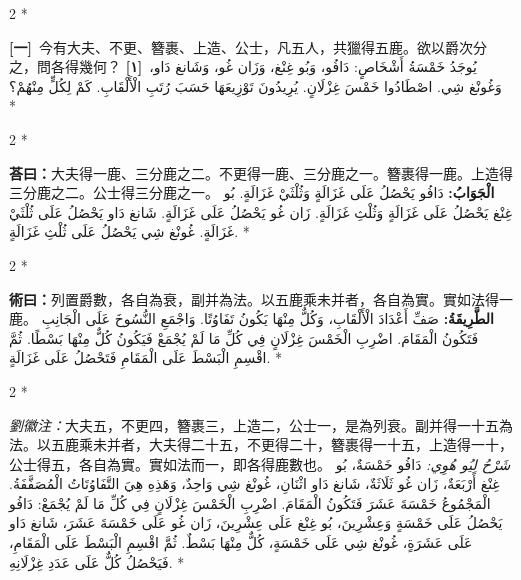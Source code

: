 \documentclass[11pt,a4paper]{article}
\newcommand{\ar}[1]{\arabicfont\beginR #1\endR}
\newcommand{\problemnum}[1]{\textbf{[\ignorespaces#1\unskip]}}
\newenvironment{bilingual}{%
  \begin{paracol}{2}%
  \switchcolumn[0]*%
}{%
  \end{paracol}%
}
\newcommand{\cnline}[1]{\switchcolumn[0]\noindent #1 \switchcolumn[1]}
\newcommand{\arline}[1]{\noindent\ar{#1} \switchcolumn[0]*}
\newenvironment{prob bilingual}{%
  \begin{paracol}{2}%
  \switchcolumn[0]*%
}{%
  \end{paracol}%
  \vspace{0.3em}%
}
\begin{document}
\vspace{0.5em}

\begin{bilingual}
\cnline{\problemnum{一}\, 今有大夫、不更、簪裹、上造、公士，凡五人，共獵得五鹿。欲以爵次分之，問各得幾何？}
\arline{\problemnum{١}\, يُوجَدُ خَمْسَةُ أَشْخَاصٍ: دَافُو، وَبُو غِنْغ، وَزَان غُو، وَشَانغ دَاو، وَغُونْغ شِي. اصْطَادُوا خَمْسَ غِزْلَانٍ. يُرِيدُونَ تَوْزِيعَهَا حَسَبَ رُتَبِ الْأَلْقَابِ. كَمْ لِكُلٍّ مِنْهُمْ؟}
\end{bilingual}

\begin{bilingual}
\cnline{\textcolor{answercolor}{\textbf{荅曰：}}大夫得一鹿、三分鹿之二。不更得一鹿、三分鹿之一。簪裹得一鹿。上造得三分鹿之二。公士得三分鹿之一。}
\arline{\textcolor{answercolor}{\textbf{الْجَوَابُ:}} دَافُو يَحْصُلُ عَلَى غَزَالَةٍ وَثُلْثَيْ غَزَالَةٍ. بُو غِنْغ يَحْصُلُ عَلَى غَزَالَةٍ وَثُلْثِ غَزَالَةٍ. زَان غُو يَحْصُلُ عَلَى غَزَالَةٍ. شَانغ دَاو يَحْصُلُ عَلَى ثُلْثَيْ غَزَالَةٍ. غُونْغ شِي يَحْصُلُ عَلَى ثُلْثِ غَزَالَةٍ.}
\end{bilingual}

\begin{bilingual}
\cnline{%
\textcolor{methodcolor}{\textbf{術曰：}}列置爵數，各自為衰，副并為法。以五鹿乘未并者，各自為實。實如法得一鹿。
}
\arline{%
\textcolor{methodcolor}{\textbf{الطَّرِيقَةُ:}} صَفِّ أَعْدَادَ الْأَلْقَابِ، وَكُلٌّ مِنْهَا يَكُونُ تَفَاوُتًا. وَاجْمَعِ النُّسُوخَ عَلَى الْجَانِبِ فَتَكُونُ الْمَقَامَ. اضْرِبِ الْخَمْسَ غِزْلَانٍ فِي كُلِّ مَا لَمْ يُجْمَعْ فَيَكُونُ كُلٌّ مِنْهَا بَسْطًا. ثُمَّ اقْسِمِ الْبَسْطَ عَلَى الْمَقَامِ فَتَحْصُلُ عَلَى غَزَالَةٍ.
}
\end{bilingual}

\begin{bilingual}
\cnline{%
\textcolor{commentarycolor}{\small\textit{劉徽注：}}大夫五，不更四，簪裹三，上造二，公士一，是為列衰。副并得一十五為法。以五鹿乘未并者，大夫得二十五，不更得二十，簪裹得一十五，上造得一十，公士得五，各自為實。實如法而一，即各得鹿數也。
}
\arline{%
\textcolor{commentarycolor}{\small\textit{شَرْحُ لِيُو هُوِي:}} دَافُو خَمْسَةٌ، بُو غِنْغ أَرْبَعَةٌ، زَان غُو ثَلَاثَةٌ، شَانغ دَاو اثْنَانِ، غُونْغ شِي وَاحِدٌ، وَهَذِهِ هِيَ التَّفَاوُتَاتُ الْمُصَفَّفَةُ. الْمَجْمُوعُ خَمْسَةَ عَشَرَ فَتَكُونُ الْمَقَامَ. اضْرِبِ الْخَمْسَ غِزْلَانٍ فِي كُلِّ مَا لَمْ يُجْمَعْ: دَافُو يَحْصُلُ عَلَى خَمْسَةٍ وَعِشْرِينَ، بُو غِنْغ عَلَى عِشْرِينَ، زَان غُو عَلَى خَمْسَةَ عَشَرَ، شَانغ دَاو عَلَى عَشَرَةٍ، غُونْغ شِي عَلَى خَمْسَةٍ، كُلٌّ مِنْهَا بَسْطٌ. ثُمَّ اقْسِمِ الْبَسْطَ عَلَى الْمَقَامِ، فَيَحْصُلُ كُلٌّ عَلَى عَدَدِ غِزْلَانِهِ.
}
\end{bilingual}
\end{document}

